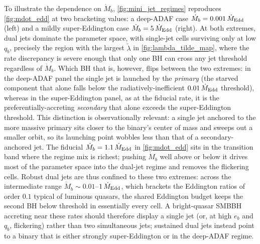 \documentclass[fleqn,usenatbib]{mnras}
\begin{document}
To illustrate the dependence on $\dot{M}_b$, \autoref{fig:mini_jet_regimes} reproduces \autoref{fig:mdot_edd} at two bracketing values: a deep-ADAF case $\dot{M}_b = 0.001\,\dot{M}_{\rm Edd}$ (left) and a mildly super-Eddington case $\dot{M}_b = 5\,\dot{M}_{\rm Edd}$ (right). At both extremes, dual jets dominate the parameter space, with single-jet cells surviving only at low $q_b$, precisely the region with the largest $\tilde{\lambda}$ in \autoref{fig:lambda_tilde_map}, where the rate discrepancy is severe enough that only one BH can cross any jet threshold regardless of $\dot{M}_b$. Which BH that is, however, flips between the two extremes: in the deep-ADAF panel the single jet is launched by the \textit{primary} (the starved component that alone falls below the radiatively-inefficient $0.01\,\dot{M}_{\rm Edd}$ threshold), whereas in the super-Eddington panel, as at the fiducial rate, it is the preferentially-accreting \textit{secondary} that alone exceeds the super-Eddington threshold. This distinction is observationally relevant: a single jet anchored to the more massive primary sits closer to the binary's center of mass and sweeps out a smaller orbit, so its launching point wobbles less than that of a secondary-anchored jet. The fiducial $\dot{M}_b = 1.1\,\dot{M}_{\rm Edd}$ in \autoref{fig:mdot_edd} sits in the transition band where the regime mix is richest; pushing $\dot{M}_b$ well above or below it drives most of the parameter space into the dual-jet regime and removes the flickering cells. Robust dual jets are thus confined to these two extremes: across the intermediate range $\dot{M}_b \sim 0.01$--$1\,\dot{M}_{\rm Edd}$, which brackets the Eddington ratios of order $0.1$ typical of luminous quasars, the shared Eddington budget keeps the second BH below threshold in essentially every cell. A bright-quasar SMBBH accreting near these rates should therefore display a single jet (or, at high $e_b$ and $q_b$, flickering) rather than two simultaneous jets; sustained dual jets instead point to a binary that is either strongly super-Eddington or in the deep-ADAF regime.
\end{document}
